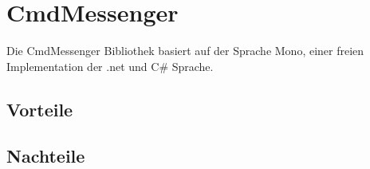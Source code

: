\section {CmdMessenger}
Die CmdMessenger Bibliothek basiert auf der Sprache Mono, einer freien 
Implementation der .net und C\# Sprache.
\subsection{Vorteile}
\subsection{Nachteile}
